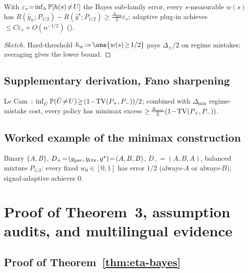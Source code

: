 \begin{proposition}
\label{prop:t2-separability}
With $\varepsilon_s\!=\!\inf_h\mathbb{P}[h(s)\!\ne\!U]$ the Bayes sub-family
error, every $s$-measurable $w(s)$ has
$R(\hat y_w;P_{1/2})\!-\!R(\hat y^\star;P_{1/2})\!\ge\!\tfrac{\Delta_{\min}}{2}\varepsilon_s$;
adaptive plug-in achieves $\le\!C\varepsilon_s\!+\!O(n^{-1/2})$
().
\end{proposition}

\begin{proof}[Sketch]
Hard-threshold $h_w\!:=\!\one{w(s)\!\ge\!1/2}$ pays $\Delta_\pm/2$
on regime mistakes; averaging gives the lower bound.
\end{proof}

\subsection{Supplementary derivation, Fano sharpening}
\label{app:fano-sharpening}

\begin{proposition}
\label{prop:lecam-thm2}
Le Cam~\citep[Lemma~2.2]{tsybakov2009nonparametric}:
$\inf_{\hat U}\mathbb{P}(\hat U\!\ne\!U)\!\ge\!(1\!-\!\operatorname{TV}(P_+,P_-))/2$;
combined with $\Delta_{\min}$ regime-mistake cost, every policy
has minimax excess $\ge\!\tfrac{\Delta_{\min}}{2}(1\!-\!\operatorname{TV}(P_+,P_-))$.
\end{proposition}


\subsection{Worked example of the minimax construction}
\label{app:worked-minimax}

Binary $\{A,B\}$, $D_+\!=\!(y_{\mathrm{par}},y_{\mathrm{ctx}},y^\star)\!=\!(A,B,B)$,
$D_-\!=\!(A,B,A)$, balanced mixture $P_{1/2}$: every fixed
$w_0\!\in\![0,1]$ has error $1/2$ (always-$A$ or always-$B$);
signal-adaptive achieves $0$.



\section{Proof of Theorem~3, assumption audits, and multilingual evidence}
\label{app:letter-E}

\subsection{Proof of Theorem~\ref{thm:eta-bayes}}
\label{app:thm3}

